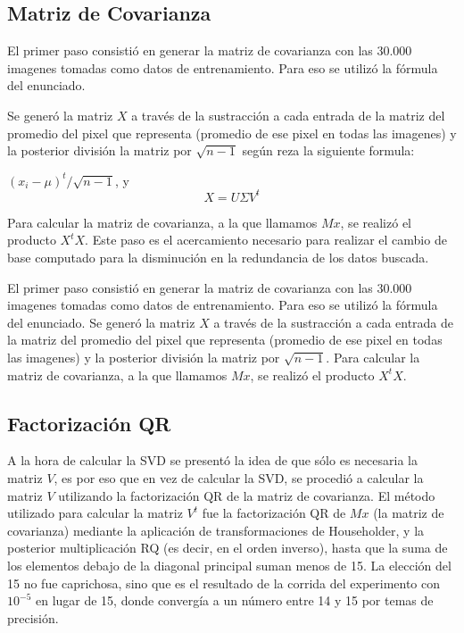 \subsection{Matriz de Covarianza}

El primer paso consisti\'o en generar la matriz de covarianza con las 30.000 imagenes tomadas como datos
de entrenamiento. Para eso se utiliz\'o la f\'ormula del enunciado.

Se gener\'o la matriz $X$ a trav\'es
de la sustracci\'on a cada entrada de la matriz del promedio del pixel que
representa (promedio de ese pixel en todas las imagenes) y la posterior
divisi\'on la matriz por $\sqrt{n-1}$ seg\'un reza la siguiente formula:

$(x_i - \mu)^{t}/\sqrt{n-1}$, y $$X=U \Sigma V^t$$

Para calcular la matriz de covarianza, a la que llamamos $Mx$, se realiz\'o el
producto $X^tX$. Este paso es el acercamiento necesario para realizar el cambio
de base computado para la disminuci\'on en la redundancia de los datos buscada.

El primer paso consisti\'o en generar la matriz de covarianza con las 30.000 imagenes tomadas como datos
de entrenamiento. Para eso se utiliz\'o la f\'ormula del enunciado. Se gener\'o la matriz $X$ a trav\'es
de la sustracci\'on a cada entrada de la matriz del promedio del pixel que representa (promedio de ese
pixel en todas las imagenes) y la posterior divisi\'on la matriz por $\sqrt{n-1}$. Para calcular la
matriz de covarianza, a la que llamamos $Mx$, se realiz\'o el producto $X^tX$.

\subsection{Factorizaci\'on QR}
A la hora de calcular la SVD se present\'o la idea de que s\'olo es necesaria la matriz $V$, es por
eso que en vez de calcular la SVD, se procedi\'o a calcular la matriz $V$ utilizando la factorizaci\'on
QR de la matriz de covarianza. El m\'etodo utilizado para calcular la matriz $V^t$ fue la factorizaci\'on
QR de $Mx$ (la matriz de covarianza) mediante la aplicaci\'on de transformaciones de Householder, y la
posterior multiplicaci\'on RQ (es decir, en el orden inverso), hasta que la suma de los elementos debajo
de la diagonal principal suman menos de 15. La elecci\'on del 15 no fue caprichosa, sino que es el
resultado de la corrida del experimento con $10^{-5}$ en lugar de 15, donde converg\'ia a un n\'umero
entre 14 y 15 por temas de precisi\'on.

